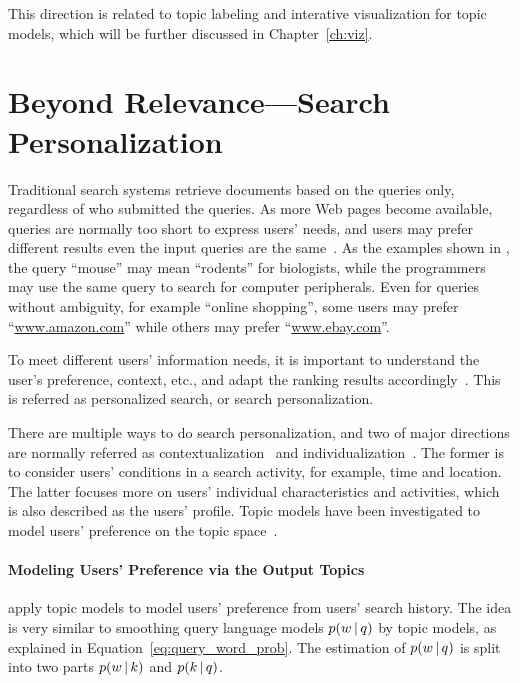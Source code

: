 This direction is related to topic labeling and
interative visualization for topic models, which will be further
discussed in Chapter~\ref{ch:viz}.

\section{Beyond Relevance---Search Personalization}

Traditional search systems retrieve documents based on the queries
only, regardless of who submitted the queries.  As more Web pages
become available, queries are normally too short to express users'
needs, and users may prefer different results even the input queries
are the same~\citep{Jansen-2000,Dou-2007}.  As the examples shown in
\citet{Dou-2007}, the query ``mouse'' may mean ``rodents'' for
biologists, while the programmers may use the same query to search for
computer peripherals. Even for queries without ambiguity, for example
``online shopping'', some users may prefer ``\url{www.amazon.com}''
while others may prefer ``\url{www.ebay.com}''.

To meet different users' information needs, it is important to
understand the user's preference, context, etc., and adapt the ranking
results accordingly~\citep{Pitkow-2002,Micarelli-2007}.  This is
referred as personalized search, or search personalization.

There are multiple ways to do search personalization, and two of major
directions are normally referred as
contextualization~\citep{Melucci-2012,} and
individualization~\citep{Pitkow-2002}. The former is to consider
users' conditions in a search activity, for example, time and
location.  The latter focuses more on users' individual
characteristics and activities, which is also described as the users'
profile.  Topic models have been investigated to model users'
preference on the topic space~\citep{Song-2010,Carman-2010}.

\paragraph{Modeling Users' Preference via the Output Topics}

\citet{Song-2010} apply topic models to model users' preference from
users' search history. The idea is very similar to smoothing query
language models $p(w \, | \, q)$ by topic models, as explained in
Equation~\ref{eq:query_word_prob}. The estimation of $p(w \, | \, q)$ is
split into two parts $p(w \, | \, k)$ and $p(k \, | \, q)$.

